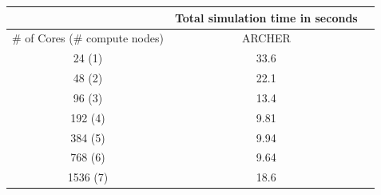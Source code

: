 \begin{center}
\label{table:perf-archer}
\begin{tabular}{|c|c|c|}
\hline
\multicolumn{1}{|l|}{}            & \multicolumn{1}{c|}{Total simulation time in seconds}               \\ \hline
\multicolumn{1}{|l|}{\# of Cores (\# compute nodes)} & \multicolumn{1}{c|}{ARCHER}  \\ \hline
24 (1)                                & 33.6                                           \\ \hline
48 (2)                                & 22.1                                         \\ \hline
96 (3)                               & 13.4                                       \\ \hline
192 (4)                              & 9.81                                           \\ \hline
384 (5)                               & 9.94                                               \\ \hline
768 (6)                              & 9.64                                              \\ \hline
1536 (7)                              & 18.6                                              \\ \hline
\end{tabular}
\end{center}


\vspace{0.5cm}

\noindent%
\begin{minipage}{\linewidth}%
 \label{fig:hemelb-perf-overview}%
\end{minipage}

